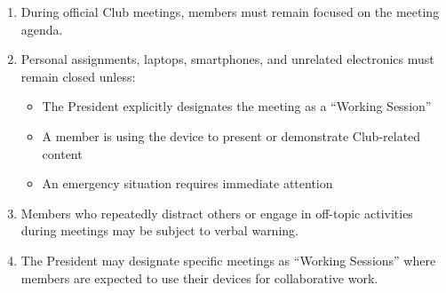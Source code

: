 
\begin{enumerate}[label=\alph*), leftmargin=2em, itemsep=0.3em]
    \item During official Club meetings, members must remain focused on the meeting agenda.
    
    \item Personal assignments, laptops, smartphones, and unrelated electronics must remain closed unless:
    \begin{itemize}[leftmargin=1.5em, itemsep=0.2em]
        \item The President explicitly designates the meeting as a ``Working Session''
        \item A member is using the device to present or demonstrate Club-related content
        \item An emergency situation requires immediate attention
    \end{itemize}
    
    \item Members who repeatedly distract others or engage in off-topic activities during meetings may be subject to verbal warning.
    
    \item The President may designate specific meetings as ``Working Sessions'' where members are expected to use their devices for collaborative work.
\end{enumerate}


